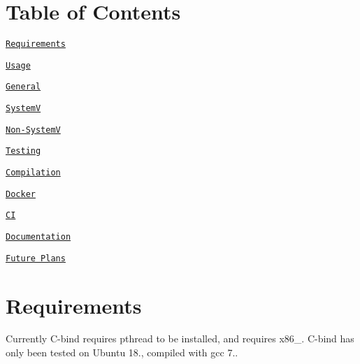 \href{https://travis-ci.org/zwimer/C-bind}{\tt }

\section*{Table of Contents}


\begin{DoxyEnumerate}
\item \href{#requirements}{\tt Requirements}
\end{DoxyEnumerate}
\begin{DoxyEnumerate}
\item \href{#usage}{\tt Usage}
\begin{DoxyItemize}
\item \href{#general}{\tt General}
\item \href{#systemv}{\tt SystemV}
\item \href{#non-systemv}{\tt Non-\/\+SystemV}
\end{DoxyItemize}
\end{DoxyEnumerate}
\begin{DoxyEnumerate}
\item \href{#testing}{\tt Testing}
\end{DoxyEnumerate}
\begin{DoxyEnumerate}
\item \href{#compilation}{\tt Compilation}
\end{DoxyEnumerate}
\begin{DoxyEnumerate}
\item \href{#docker}{\tt Docker}
\end{DoxyEnumerate}
\begin{DoxyEnumerate}
\item \href{#ci}{\tt CI}
\end{DoxyEnumerate}
\begin{DoxyEnumerate}
\item \href{#documentation}{\tt Documentation}
\end{DoxyEnumerate}
\begin{DoxyEnumerate}
\item \href{#future-plans}{\tt Future Plans} 


\end{DoxyEnumerate}

\section*{Requirements}

Currently {\ttfamily C-\/bind} requires {\ttfamily pthread} to be installed, and requires {\ttfamily x86\+\_}. {\ttfamily C-\/bind} has only been tested on {\ttfamily Ubuntu 18.}, compiled with {\ttfamily gcc 7.}.

